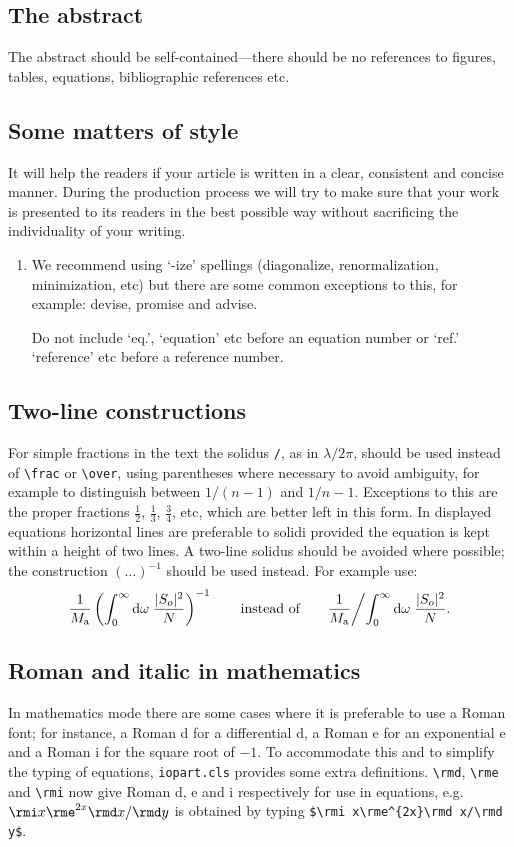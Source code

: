 \subsection{The abstract}
The abstract should be self-contained---there should be no references to
figures, tables, equations, bibliographic references etc.

\subsection{Some matters of style}
It will help the readers if your article is written in a clear,
consistent and concise manner. During the production process
we will try to make sure that your work is presented to its
readers in the best possible way without sacrificing the individuality of
your writing.

\begin{enumerate}
\item We recommend using `-ize' spellings (diagonalize,
renormalization, minimization, etc) but there are some common
exceptions to this, for example: devise,
promise and advise.

Do not include `eq.', `equation' etc before an equation number or `ref.'\, `reference' etc before a reference number.
\end{enumerate}

\subsection{Two-line constructions}
For simple fractions in the text the solidus \verb"/", as in
$\lambda/2\pi$, should be used instead of \verb"\frac" or \verb"\over",
using parentheses where necessary to avoid ambiguity,
for example to distinguish between $1/(n-1)$ and $1/n-1$. Exceptions to
this are the proper fractions $\frac12$, $\frac13$, $\frac34$,
etc, which are better left in this form. In displayed equations
horizontal lines are preferable to solidi provided the equation is
kept within a height of two lines. A two-line solidus should be
avoided where possible; the construction $(\ldots)^{-1}$ should be
used instead. For example use:
\begin{equation*}
\frac{1}{M_{\rm a}}\left(\int^\infty_0{\rm d}
\omega\;\frac{|S_o|^2}{N}\right)^{-1}\qquad\mbox{instead of}\qquad
\frac{1}{M_{\rm a}}\biggl/\int^\infty_0{\rm d}
\omega\;\frac{|S_o|^2}{N}.
\end{equation*}

\subsection{Roman and italic in mathematics}
In mathematics mode there are some cases where it is preferable to use a
Roman font; for instance, a Roman d for a differential d, a Roman e for
an exponential e and a Roman i for the square root of $-1$. To
accommodate this and to simplify the  typing of equations,
\verb"iopart.cls" provides some extra definitions. \verb"\rmd",
\verb"\rme" and \verb"\rmi" now give Roman d, e and i respectively for
use in equations, e.g.\ $\rmi x\rme^{2x}\rmd x/\rmd y$ is obtained by
typing \verb"$\rmi x\rme^{2x}\rmd x/\rmd y$".

